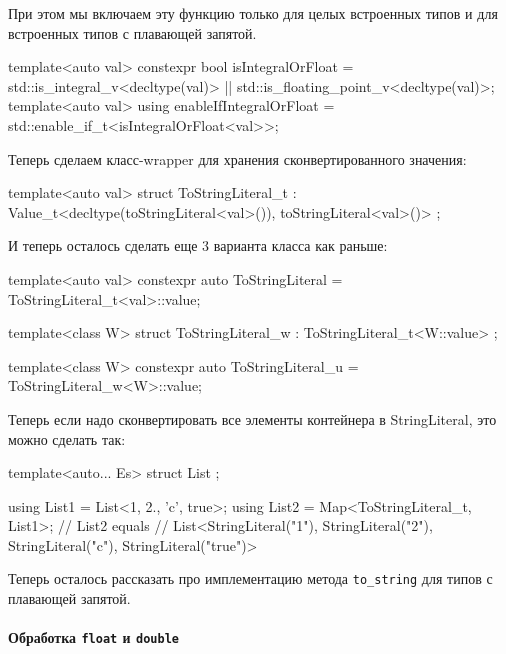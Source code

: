 При этом мы включаем эту функцию только для целых встроенных типов и для встроенных типов с плавающей запятой.
\begin{cppcode}
template<auto val>
constexpr bool isIntegralOrFloat = std::is_integral_v<decltype(val)> ||
                                   std::is_floating_point_v<decltype(val)>;
template<auto val>
using enableIfIntegralOrFloat = std::enable_if_t<isIntegralOrFloat<val>>;
\end{cppcode}
Теперь сделаем класс-wrapper для хранения сконвертированного значения:
\begin{cppcode}
template<auto val>
struct ToStringLiteral_t
    : Value_t<decltype(toStringLiteral<val>()), toStringLiteral<val>()> {};
\end{cppcode}
И теперь осталось сделать еще $3$ варианта класса как раньше:
\begin{cppcode}
template<auto val>
constexpr auto ToStringLiteral = ToStringLiteral_t<val>::value;

template<class W>
struct ToStringLiteral_w : ToStringLiteral_t<W::value> {};

template<class W>
constexpr auto ToStringLiteral_u = ToStringLiteral_w<W>::value;
\end{cppcode}
Теперь если надо сконвертировать все элементы контейнера в StringLiteral, это можно сделать так:
\begin{cppcode}
template<auto... Es>
struct List {};

using List1 = List<1, 2., 'c', true>;
using List2 = Map<ToStringLiteral_t, List1>;
// List2 equals 
// List<StringLiteral("1"), StringLiteral("2"), StringLiteral("c"), StringLiteral("true")>
\end{cppcode}
Теперь осталось рассказать про имплементацию метода \verb"to_string" для типов с плавающей запятой.

\paragraph{Обработка \texttt{float} и \texttt{double}}

